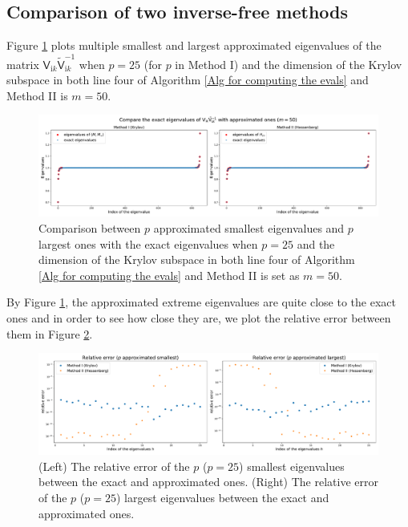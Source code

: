 
\subsection{Comparison of two inverse-free methods}
Figure \ref{Method of GEP for m = 50} plots multiple smallest and largest approximated eigenvalues of the matrix $\mathsf{V}_{\mathrm{i}k}\tilde{\mathsf{V}}_{\mathrm{i}k}^{-1}$ when 
$p = 25$ (for $p$ in Method I) and the dimension of the Krylov subspace in both line four of Algorithm \ref{Alg for computing the evals} and Method II is $m = 50$.

\begin{figure}[H]
    \centering
    \includegraphics[scale = 0.36]{figures/Method_GEP_m_50.pdf}
    \caption{Comparison between $p$ approximated smallest eigenvalues and $p$ largest ones with the exact eigenvalues when $p = 25$ and the dimension of the 
    Krylov subspace in both line four of Algorithm \ref{Alg for computing the evals} and Method II is set as $m = 50$. }
    \label{Method of GEP for m = 50}
\end{figure}

By Figure \ref{Method of GEP for m = 50}, the approximated extreme eigenvalues are quite close to the exact ones and in order to see how close they are, we plot the
relative error between them in Figure \ref{relative error of GEP for m = 50}.
\begin{figure}[H]
    \centering
    \includegraphics[scale = 0.36]{figures/rel_err_m_50.pdf}
    \caption{(Left) The relative error of the $p$ ($p = 25$) smallest eigenvalues between the exact and approximated ones. 
    (Right) The relative error of the $p$  ($p = 25$) largest eigenvalues between the exact and approximated ones.}
    \label{relative error of GEP for m = 50}
\end{figure}

